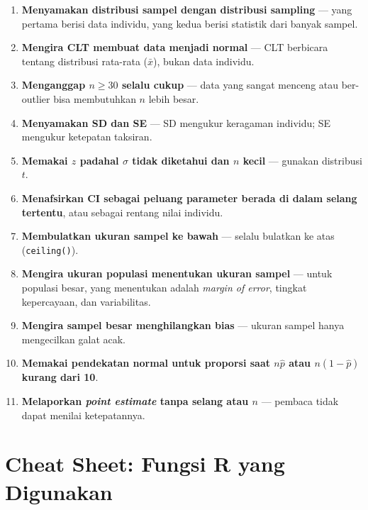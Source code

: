 \documentclass[
  indonesian,
  letterpaper,
]{book}
\providecommand{\tightlist}{%
  \setlength{\itemsep}{0pt}\setlength{\parskip}{0pt}}
\begin{document}
\begin{enumerate}
\def\labelenumi{\arabic{enumi}.}
\tightlist
\item
  \textbf{Menyamakan distribusi sampel dengan distribusi sampling} ---
  yang pertama berisi data individu, yang kedua berisi statistik dari
  banyak sampel.
\item
  \textbf{Mengira CLT membuat data menjadi normal} --- CLT berbicara
  tentang distribusi rata-rata (\(\bar{x}\)), bukan data individu.
\item
  \textbf{Menganggap \(n \ge 30\) selalu cukup} --- data yang sangat
  menceng atau ber-outlier bisa membutuhkan \(n\) lebih besar.
\item
  \textbf{Menyamakan SD dan SE} --- SD mengukur keragaman individu; SE
  mengukur ketepatan taksiran.
\item
  \textbf{Memakai \(z\) padahal \(\sigma\) tidak diketahui dan \(n\)
  kecil} --- gunakan distribusi \(t\).
\item
  \textbf{Menafsirkan CI sebagai peluang parameter berada di dalam
  selang tertentu}, atau sebagai rentang nilai individu.
\item
  \textbf{Membulatkan ukuran sampel ke bawah} --- selalu bulatkan ke
  atas (\texttt{ceiling()}).
\item
  \textbf{Mengira ukuran populasi menentukan ukuran sampel} --- untuk
  populasi besar, yang menentukan adalah \emph{margin of error}, tingkat
  kepercayaan, dan variabilitas.
\item
  \textbf{Mengira sampel besar menghilangkan bias} --- ukuran sampel
  hanya mengecilkan galat acak.
\item
  \textbf{Memakai pendekatan normal untuk proporsi saat \(n\hat{p}\)
  atau \(n(1 - \hat{p})\) kurang dari 10}.
\item
  \textbf{Melaporkan \emph{point estimate} tanpa selang atau \(n\)} ---
  pembaca tidak dapat menilai ketepatannya.
\end{enumerate}

\section{Cheat Sheet: Fungsi R yang
Digunakan}\label{cheat-sheet-fungsi-r-yang-digunakan-5}
\end{document}
